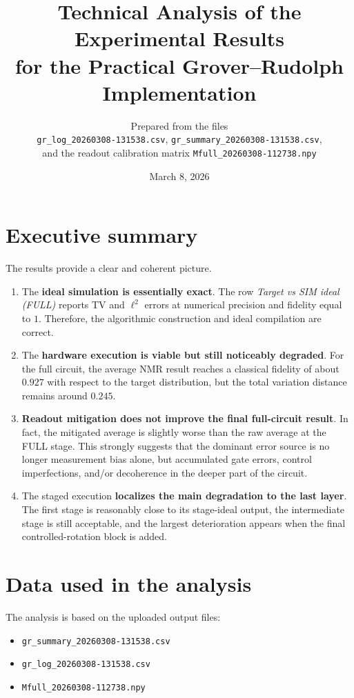 \documentclass[11pt]{article}
\title{Technical Analysis of the Experimental Results\\for the Practical Grover--Rudolph Implementation}
\author{Prepared from the files\\\texttt{gr\_log\_20260308-131538.csv}, \texttt{gr\_summary\_20260308-131538.csv},\\and the readout calibration matrix \texttt{Mfull\_20260308-112738.npy}}
\date{March 8, 2026}
\begin{document}
\maketitle

\section*{Executive summary}

The results provide a clear and coherent picture.

\begin{enumerate}[label=\arabic*.]
\item The \textbf{ideal simulation is essentially exact}. The row \emph{Target vs SIM ideal (FULL)} reports TV and $\ell^2$ errors at numerical precision and fidelity equal to $1$. Therefore, the algorithmic construction and ideal compilation are correct.

\item The \textbf{hardware execution is viable but still noticeably degraded}. For the full circuit, the average NMR result reaches a classical fidelity of about $0.927$ with respect to the target distribution, but the total variation distance remains around $0.245$.

\item \textbf{Readout mitigation does not improve the final full-circuit result}. In fact, the mitigated average is slightly worse than the raw average at the FULL stage. This strongly suggests that the dominant error source is no longer measurement bias alone, but accumulated gate errors, control imperfections, and/or decoherence in the deeper part of the circuit.

\item The staged execution \textbf{localizes the main degradation to the last layer}. The first stage is reasonably close to its stage-ideal output, the intermediate stage is still acceptable, and the largest deterioration appears when the final controlled-rotation block is added.
\end{enumerate}

\section{Data used in the analysis}

The analysis is based on the uploaded output files:
\begin{itemize}
\item \texttt{gr\_summary\_20260308-131538.csv}
\item \texttt{gr\_log\_20260308-131538.csv}
\item \texttt{Mfull\_20260308-112738.npy}
\end{itemize}
\end{document}
